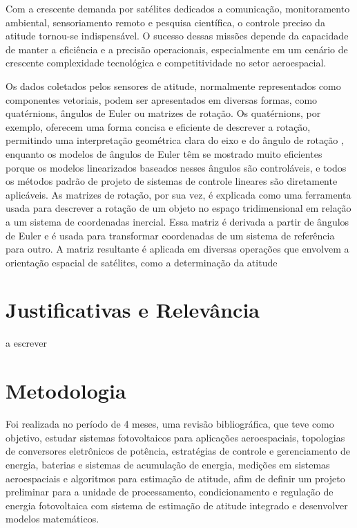 \documentclass[
	12pt,				%
	openright,			%
	oneside,			%
	a4paper,			%
	english,			%
	brazil				%
	]{abntex2}
\begin{document}
Com a crescente demanda por satélites dedicados a comunicação, monitoramento ambiental, sensoriamento remoto e pesquisa científica, o controle preciso da atitude tornou-se indispensável. O sucesso dessas missões depende da capacidade de manter a eficiência e a precisão operacionais, especialmente em um cenário de crescente complexidade tecnológica e competitividade no setor aeroespacial.

Os dados coletados pelos sensores de atitude, normalmente representados como componentes vetoriais, podem ser apresentados em diversas formas, como quatérnions, ângulos de Euler ou matrizes de rotação. Os quatérnions, por exemplo, oferecem uma forma concisa e eficiente de descrever a rotação, permitindo uma interpretação geométrica clara do eixo e do ângulo de rotação \cite{jia2013quaternions}, enquanto os modelos de ângulos de Euler têm se mostrado muito eficientes porque os modelos linearizados baseados nesses ângulos são controláveis, e todos os métodos padrão de projeto de sistemas de controle lineares são diretamente aplicáveis\cite{YANG2012198}. As matrizes de rotação, por sua vez, é explicada como uma ferramenta usada para descrever a rotação de um objeto no espaço tridimensional em relação a um sistema de coordenadas inercial. Essa matriz é derivada a partir de ângulos de Euler e é usada para transformar coordenadas de um sistema de referência para outro. A matriz resultante é aplicada em diversas operações que envolvem a orientação espacial de satélites, como a determinação da atitude \cite{silva2016}


  

\section{Justificativas e Relevância}

a escrever

\section{Metodologia}
Foi realizada no período de 4 meses, uma revisão bibliográfica, que teve como objetivo, estudar sistemas fotovoltaicos para aplicações aeroespaciais, topologias de conversores eletrônicos de potência, estratégias de controle e gerenciamento de energia, baterias e sistemas de acumulação de energia, medições em sistemas aeroespaciais e algoritmos para estimação de atitude, afim de definir um projeto preliminar para a unidade de processamento, condicionamento e regulação de energia fotovoltaica com sistema de estimação de atitude integrado e desenvolver modelos matemáticos. 
\end{document}
